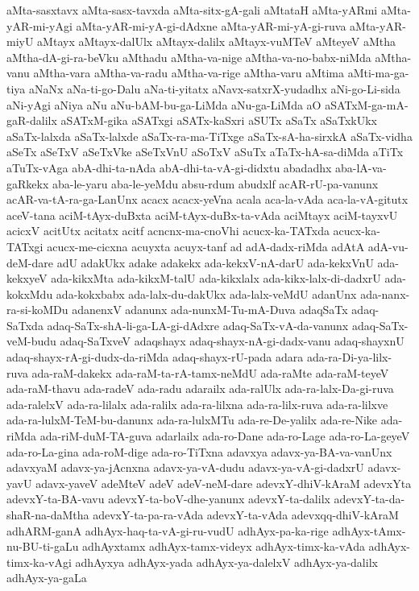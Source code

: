 {aMta-sasxtavx
aMta-sasx-tavxda
aMta-sitx-gA-gali
aMtataH
aMta-yARmi
aMta-yAR-mi-yAgi
aMta-yAR-mi-yA-gi-dAdxne
aMta-yAR-mi-yA-gi-ruva
aMta-yAR-miyU
aMtayx
aMtayx-dalUlx
aMtayx-dalilx
aMtayx-vuMTeV
aMteyeV
aMtha
aMtha-dA-gi-ra-beVku
aMthadu
aMtha-va-nige
aMtha-va-no-babx-niMda
aMtha-vanu
aMtha-vara
aMtha-va-radu
aMtha-va-rige
aMtha-varu
aMtima
aMti-ma-ga-tiya
aNaNx
aNa-ti-go-Dalu
aNa-ti-yitatx
aNavx-satxrX-yudadhx
aNi-go-Li-sida
aNi-yAgi
aNiya
aNu
aNu-bAM-bu-ga-LiMda
aNu-ga-LiMda
aO
aSATxM-ga-mA-gaR-dalilx
aSATxM-gika
aSATxgi
aSATx-kaSxri
aSUTx
aSaTx
aSaTxkUkx
aSaTx-lalxda
aSaTx-lalxde
aSaTx-ra-ma-TiTxge
aSaTx-sA-ha-sirxkA
aSaTx-vidha
aSeTx
aSeTxV
aSeTxVke
aSeTxVnU
aSoTxV
aSuTx
aTaTx-hA-sa-diMda
aTiTx
aTuTx-vAga
abA-dhi-ta-nAda
abA-dhi-ta-vA-gi-didxtu
abadadhx
aba-lA-va-gaRkekx
aba-le-yaru
aba-le-yeMdu
absu-rdum
abudxlf
acAR-rU-pa-vanunx
acAR-va-tA-ra-ga-LanUnx
acacx
acacx-yeVna
acala
aca-la-vAda
aca-la-vA-gitutx
aceV-tana
aciM-tAyx-duBxta
aciM-tAyx-duBx-ta-vAda
aciMtayx
aciM-tayxvU
acicxV
acitUtx
acitatx
acitf
acncnx-ma-cnoVhi
acucx-ka-TATxda
acucx-ka-TATxgi
acucx-me-cicxna
acuyxta
acuyx-tanf
ad
adA-dadx-riMda
adAtA
adA-vu-deM-dare
adU
adakUkx
adake
adakekx
ada-kekxV-nA-darU
ada-kekxVnU
ada-kekxyeV
ada-kikxMta
ada-kikxM-talU
ada-kikxlalx
ada-kikx-lalx-di-dadxrU
ada-kokxMdu
ada-kokxbabx
ada-lalx-du-dakUkx
ada-lalx-veMdU
adanUnx
ada-nanx-ra-si-koMDu
adanenxV
adanunx
ada-nunxM-Tu-mA-Duva
adaqSaTx
adaq-SaTxda
adaq-SaTx-shA-li-ga-LA-gi-dAdxre
adaq-SaTx-vA-da-vanunx
adaq-SaTx-veM-budu
adaq-SaTxveV
adaqshayx
adaq-shayx-nA-gi-dadx-vanu
adaq-shayxnU
adaq-shayx-rA-gi-dudx-da-riMda
adaq-shayx-rU-pada
adara
ada-ra-Di-ya-lilx-ruva
ada-raM-dakekx
ada-raM-ta-rA-tamx-neMdU
ada-raMte
ada-raM-teyeV
ada-raM-thavu
ada-radeV
ada-radu
adarailx
ada-ralUlx
ada-ra-lalx-Da-gi-ruva
ada-ralelxV
ada-ra-lilalx
ada-ralilx
ada-ra-lilxna
ada-ra-lilx-ruva
ada-ra-lilxve
ada-ra-lulxM-TeM-bu-danunx
ada-ra-lulxMTu
ada-re-De-yalilx
ada-re-Nike
ada-riMda
ada-riM-duM-TA-guva
adarlailx
ada-ro-Dane
ada-ro-Lage
ada-ro-La-geyeV
ada-ro-La-gina
ada-roM-dige
ada-ro-TiTxna
adavxya
adavx-ya-BA-va-vanUnx
adavxyaM
adavx-ya-jAcnxna
adavx-ya-vA-dudu
adavx-ya-vA-gi-dadxrU
adavx-yavU
adavx-yaveV
adeMteV
adeV
adeV-neM-dare
adevxY-dhiV-kAraM
adevxYta
adevxY-ta-BA-vavu
adevxY-ta-boV-dhe-yanunx
adevxY-ta-dalilx
adevxY-ta-da-shaR-na-daMtha
adevxY-ta-pa-ra-vAda
adevxY-ta-vAda
adevxqq-dhiV-kAraM
adhARM-ganA
adhAyx-haq-ta-vA-gi-ru-vudU
adhAyx-pa-ka-rige
adhAyx-tAmx-nu-BU-ti-gaLu
adhAyxtamx
adhAyx-tamx-videyx
adhAyx-timx-ka-vAda
adhAyx-timx-ka-vAgi
adhAyxya
adhAyx-yada
adhAyx-ya-dalelxV
adhAyx-ya-dalilx
adhAyx-ya-gaLa
}
